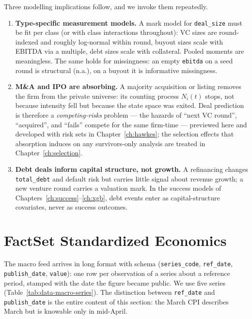 Three modelling implications follow, and we invoke them repeatedly.

\begin{enumerate}
\item \textbf{Type-specific measurement models.} A mark model for \texttt{deal\_size}
must be fit per class (or with class interactions throughout): VC sizes are
round-indexed and roughly log-normal within round, buyout sizes scale with EBITDA via a
multiple, debt sizes scale with collateral. Pooled moments are meaningless. The same
holds for missingness: an empty \texttt{ebitda} on a seed round is structural (n.a.), on
a buyout it is informative missingness.
\item \textbf{M\&A and IPO are absorbing.} A majority acquisition or listing removes the
firm from the private universe: its counting process $N_i(t)$ stops, not because
intensity fell but because the state space was exited. Deal prediction is therefore a
\emph{competing-risks} problem --- the hazards of ``next VC round'', ``acquired'', and
``fails'' compete for the same firm-time --- previewed here and developed with risk sets
in Chapter~\ref{ch:hawkes}; the selection effects that absorption induces on any
survivors-only analysis are treated in Chapter~\ref{ch:selection}.
\item \textbf{Debt deals inform capital structure, not growth.} A refinancing changes
\texttt{total\_debt} and default risk but carries little signal about revenue growth; a
new venture round carries a valuation mark. In the success models of
Chapters~\ref{ch:success}--\ref{ch:xgb}, debt events enter as capital-structure
covariates, never as success outcomes.
\end{enumerate}

\section{FactSet Standardized Economics}
\label{sec:data-factset}

The macro feed arrives in long format with schema
(\texttt{series\_code}, \texttt{ref\_date}, \texttt{publish\_date}, \texttt{value}):
one row per observation of a series about a reference period, stamped with the date the
figure became public. We use five series (Table~\ref{tab:data-macro-series}). The
distinction between \texttt{ref\_date} and \texttt{publish\_date} is the entire content
of this section: the March CPI describes March but is knowable only in mid-April.

